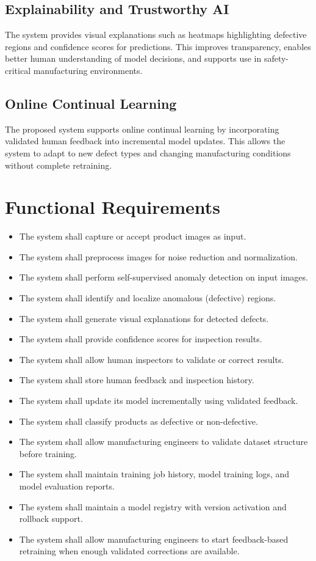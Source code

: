 \documentclass[12pt,a4paper]{article}
\begin{document}
\subsection{Explainability and Trustworthy AI}
The system provides visual explanations such as heatmaps highlighting defective regions and confidence scores for predictions. This improves transparency, enables better human understanding of model decisions, and supports use in safety-critical manufacturing environments.

\subsection{Online Continual Learning}
The proposed system supports online continual learning by incorporating validated human feedback into incremental model updates. This allows the system to adapt to new defect types and changing manufacturing conditions without complete retraining.

\section{Functional Requirements}

\begin{itemize}
    \item The system shall capture or accept product images as input.
    \item The system shall preprocess images for noise reduction and normalization.
    \item The system shall perform self-supervised anomaly detection on input images.
    \item The system shall identify and localize anomalous (defective) regions.
    \item The system shall generate visual explanations for detected defects.
    \item The system shall provide confidence scores for inspection results.
    \item The system shall allow human inspectors to validate or correct results.
    \item The system shall store human feedback and inspection history.
    \item The system shall update its model incrementally using validated feedback.
    \item The system shall classify products as defective or non-defective.
    \item The system shall allow manufacturing engineers to validate dataset structure before training.
    \item The system shall maintain training job history, model training logs, and model evaluation reports.
    \item The system shall maintain a model registry with version activation and rollback support.
    \item The system shall allow manufacturing engineers to start feedback-based retraining when enough validated corrections are available.
\end{itemize}
\end{document}

